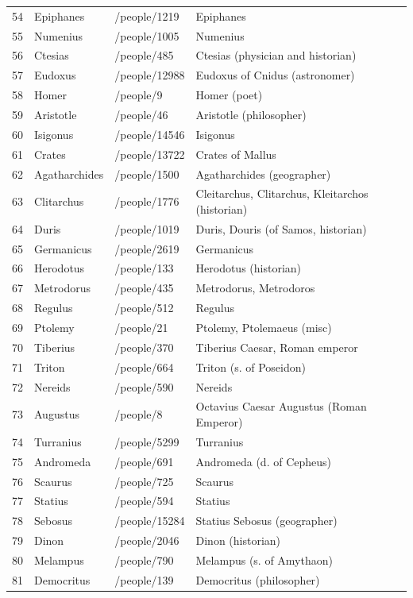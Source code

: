 \documentclass[
  12pt,
]{article}
\begin{document}
\begin{longtable}[]{@{}llll@{}}
54 & Epiphanes & /people/1219 & Epiphanes \\
55 & Numenius & /people/1005 & Numenius \\
56 & Ctesias & /people/485 & Ctesias (physician and historian) \\
57 & Eudoxus & /people/12988 & Eudoxus of Cnidus (astronomer) \\
58 & Homer & /people/9 & Homer (poet) \\
59 & Aristotle & /people/46 & Aristotle (philosopher) \\
60 & Isigonus & /people/14546 & Isigonus \\
61 & Crates & /people/13722 & Crates of Mallus \\
62 & Agatharchides & /people/1500 & Agatharchides (geographer) \\
63 & Clitarchus & /people/1776 & Cleitarchus, Clitarchus, Kleitarchos
(historian) \\
64 & Duris & /people/1019 & Duris, Douris (of Samos, historian) \\
65 & Germanicus & /people/2619 & Germanicus \\
66 & Herodotus & /people/133 & Herodotus (historian) \\
67 & Metrodorus & /people/435 & Metrodorus, Metrodoros \\
68 & Regulus & /people/512 & Regulus \\
69 & Ptolemy & /people/21 & Ptolemy, Ptolemaeus (misc) \\
70 & Tiberius & /people/370 & Tiberius Caesar, Roman emperor \\
71 & Triton & /people/664 & Triton (s. of Poseidon) \\
72 & Nereids & /people/590 & Nereids \\
73 & Augustus & /people/8 & Octavius Caesar Augustus (Roman Emperor) \\
74 & Turranius & /people/5299 & Turranius \\
75 & Andromeda & /people/691 & Andromeda (d. of Cepheus) \\
76 & Scaurus & /people/725 & Scaurus \\
77 & Statius & /people/594 & Statius \\
78 & Sebosus & /people/15284 & Statius Sebosus (geographer) \\
79 & Dinon & /people/2046 & Dinon (historian) \\
80 & Melampus & /people/790 & Melampus (s. of Amythaon) \\
81 & Democritus & /people/139 & Democritus (philosopher) \\

\end{longtable}
\end{document}
